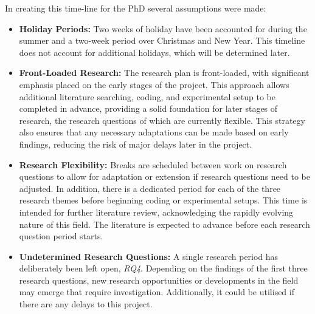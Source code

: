 \documentclass[10pt,oneside]{book}
\begin{document}
\begin{table}
\caption{Specific task details for RQ 3.}
\label{tab:taskoverview_rq3}
\end{table}

In creating this time-line for the PhD several assumptions were made:
\begin{itemize}
    \item \textbf{Holiday Periods:} Two weeks of holiday have been accounted for during the summer and a two-week period over Christmas and New Year. This timeline does not account for additional holidays, which will be determined later.
    \item \textbf{Front-Loaded Research:} The research plan is front-loaded, with significant emphasis placed on the early stages of the project. This approach allows additional literature searching, coding, and experimental setup to be completed in advance, providing a solid foundation for later stages of research, the research questions of which are currently flexible. This strategy also ensures that any necessary adaptations can be made based on early findings, reducing the risk of major delays later in the project. 
    \item \textbf{Research Flexibility:} Breaks are scheduled between work on research questions to allow for adaptation or extension if research questions need to be adjusted. In addition, there is a dedicated period for each of the three research themes before beginning coding or experimental setups. This time is intended for further literature review, acknowledging the rapidly evolving nature of this field. The literature is expected to advance before each research question period starts.
    \item \textbf{Undetermined Research Questions:} A single research period has deliberately been left open, \emph{RQ4}. Depending on the findings of the first three research questions, new research opportunities or developments in the field may emerge that require investigation. Additionally, it could be utilised if there are any delays to this project. 
\end{itemize}
\end{document}
